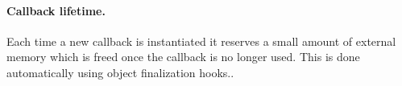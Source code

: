 






\paragraph{Callback lifetime.}
Each time a new callback is instantiated it reserves a small amount of external memory which is freed once the callback is no longer used.
This is done automatically using object finalization hooks..


